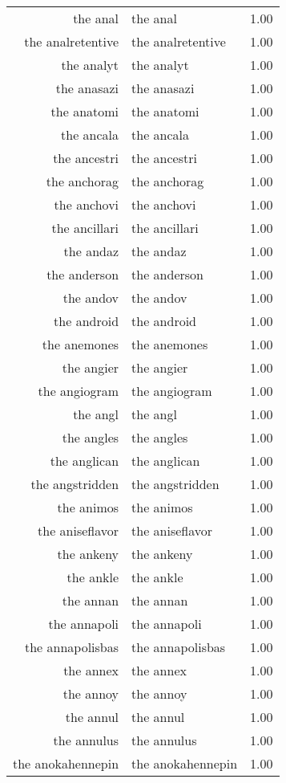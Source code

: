 \begin{table}[ht]
\begin{tabular}{rlr}
  the anal & the anal & 1.00 \\ 
  the analretentive & the analretentive & 1.00 \\ 
  the analyt & the analyt & 1.00 \\ 
  the anasazi & the anasazi & 1.00 \\ 
  the anatomi & the anatomi & 1.00 \\ 
  the ancala & the ancala & 1.00 \\ 
  the ancestri & the ancestri & 1.00 \\ 
  the anchorag & the anchorag & 1.00 \\ 
  the anchovi & the anchovi & 1.00 \\ 
  the ancillari & the ancillari & 1.00 \\ 
  the andaz & the andaz & 1.00 \\ 
  the anderson & the anderson & 1.00 \\ 
  the andov & the andov & 1.00 \\ 
  the android & the android & 1.00 \\ 
  the anemones & the anemones & 1.00 \\ 
  the angier & the angier & 1.00 \\ 
  the angiogram & the angiogram & 1.00 \\ 
  the angl & the angl & 1.00 \\ 
  the angles & the angles & 1.00 \\ 
  the anglican & the anglican & 1.00 \\ 
  the angstridden & the angstridden & 1.00 \\ 
  the animos & the animos & 1.00 \\ 
  the aniseflavor & the aniseflavor & 1.00 \\ 
  the ankeny & the ankeny & 1.00 \\ 
  the ankle & the ankle & 1.00 \\ 
  the annan & the annan & 1.00 \\ 
  the annapoli & the annapoli & 1.00 \\ 
  the annapolisbas & the annapolisbas & 1.00 \\ 
  the annex & the annex & 1.00 \\ 
  the annoy & the annoy & 1.00 \\ 
  the annul & the annul & 1.00 \\ 
  the annulus & the annulus & 1.00 \\ 
  the anokahennepin & the anokahennepin & 1.00 \\ 

\end{tabular}
\end{table}
